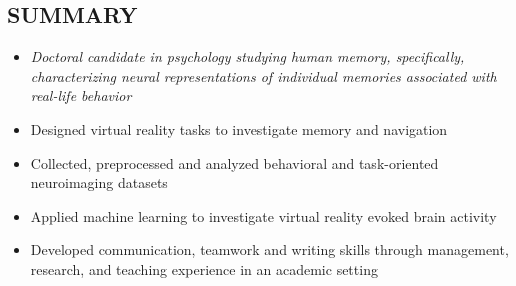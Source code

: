 \documentclass[line,margin,10pt]{res}
\begin{document}
\address{(919) 260-1824}
\address {jdstokes@ucdavis.edu}

\begin{resume}

\section{SUMMARY} 
\begin{itemize} \itemsep -2pt
\item  []{\sl Doctoral candidate in psychology studying human memory, specifically, characterizing neural representations of individual memories associated with real-life behavior}\\
\item Designed virtual reality tasks to investigate memory and navigation
\item Collected, preprocessed and analyzed behavioral and task-oriented neuroimaging datasets
\item Applied machine learning to investigate virtual reality evoked brain activity
\item Developed communication, teamwork and writing skills through management, research, and teaching experience in an academic setting
\end{itemize}


\end{resume}
\end{document}
